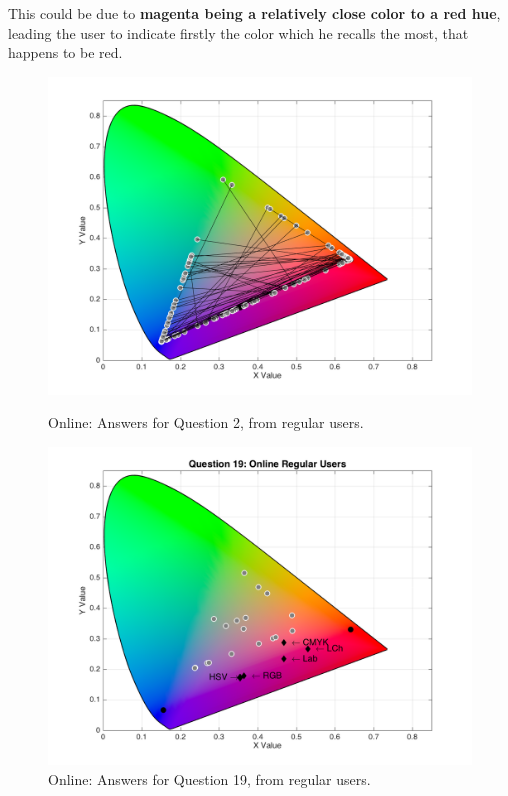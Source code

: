 This could be due to \textbf{magenta being a relatively close color to a red hue}, leading the user to indicate firstly the color which he recalls the most, that happens to be red.
%
\begin{figure}[!htbp]
  \centering
  \begin{minipage}{0.48\textwidth}
    \centering
    \includegraphics[width=\textwidth]{images/results/2_online_regularUsers.png}
    \caption[Online: Answers for Question 2, from regular users.]{Online: Answers for Question 2, from regular users.}
    \label{fig:magentablend_1}
  \end{minipage}\hfill
  \begin{minipage}{0.48\textwidth}
    \centering
    \includegraphics[width=\textwidth]{images/results/19_online_regularUsers.png}
    \caption[Online: Answers for Question 19, from regular users.]{Online: Answers for Question 19, from regular users.}
    \label{fig:magentablend_2}
  \end{minipage}
\end{figure}
%
